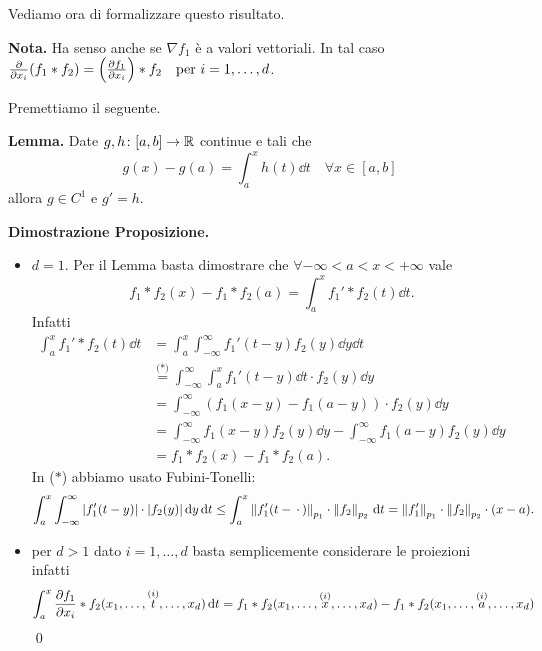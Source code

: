 Vediamo ora di formalizzare questo risultato.


\textbf{Nota.} Ha senso anche se $\nabla f_1$ è a valori vettoriali. In tal caso  $\frac{\partial}{\partial x_i}(f_1 \ast f_2) = \left( \frac{\partial f_1}{\partial x_i} \right) \ast f_2 \quad \text{per } i = 1, \dots, d $.

Premettiamo il seguente.

\textbf{Lemma.} Date $g,h \colon [a,b] \to \mathbb R$ continue e tali che
$$
	g(x) - g(a) = \int_a^x h(t) \dd t \quad \forall x \in [a,b]
$$
allora $g \in C^1$ e $g' = h$.

\vs

\textbf{Dimostrazione Proposizione.}
\begin{itemize}
	\item $d = 1$. Per il Lemma basta dimostrare che $\forall -\infty < a < x < +\infty$ vale
	$$
		f_1 \ast f_2(x) - f_1 \ast f_2(a) = \int_a^x f_1' \ast f_2(t) \dd t.
	$$
	Infatti
		$$
		\begin{aligned}
			\int_a^x f_1' \ast f_2 (t) \dd t
			& = \int_a^x \int_{-\infty}^\infty f_1'(t - y) f_2(y) \dd y \dd t \\
			& \overset{\text{($*$)}}{=} \int_{-\infty}^\infty \int_a^x f_1'(t - y) \dd t \cdot f_2(y) \dd y \\
			& = \int_{-\infty}^\infty (f_1(x - y) - f_1(a - y)) \cdot f_2(y) \dd y \\
			& = \int_{-\infty}^\infty f_1(x - y) f_2(y) \dd y - \int_{-\infty}^\infty f_1(a - y) f_2(y) \dd y \\
			& = f_1 \ast f_2(x) - f_1 \ast f_2(a).
		\end{aligned}
		$$
		In ($*$) abbiamo usato Fubini-Tonelli:
		$$
			\int_a^x \int_{-\infty}^\infty |f_1'(t-y)| \cdot |f_2(y)| \,\mathrm{d} y \,\mathrm{d} t
			\leq \int_a^x \left\lVert f_1'(t - \,\cdot\,) \right\rVert_{p_1} \cdot \left\lVert f_2 \right\rVert_{p_2} \,\mathrm{d} t 
			= \left\lVert f_1' \right\rVert_{p_1} \cdot \left\lVert f_2 \right\rVert_{p_2} \cdot (x - a).
		$$

	\item
		per $d > 1$ dato $i = 1, \dots, d$ basta semplicemente considerare le proiezioni infatti
		$$
		\int_a^x \frac{\partial f_1}{\partial x_i} \ast f_2 (x_1, \dots, \overset{\text{($i$)}}{t}, \dots, x_d) \,\mathrm{d} t
		= f_1 \ast f_2 (x_1, \dots, \overset{\text{($i$)}}{x}, \dots, x_d) - f_1 \ast f_2 (x_1, \dots, \overset{\text{($i$)}}{a}, \dots, x_d)
		$$
		\qed
\end{itemize}

